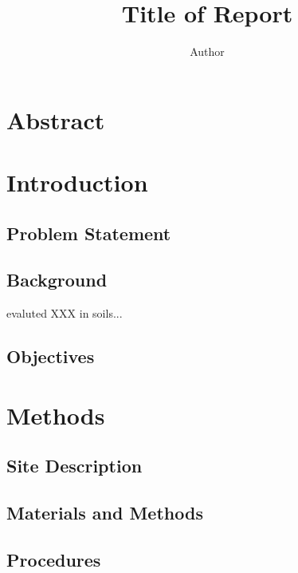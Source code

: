 \documentclass{article}\usepackage[]{graphicx}\usepackage[]{color}
\author{Author}
\title{Title of Report}
\begin{document}

\section{Abstract}



\section{Introduction}

\subsection{Problem Statement}

\subsection{Background}

\cite{lanphear1998contribution} evaluted XXX in soils...



\subsection{Objectives}



\section{Methods}

\subsection{Site Description}

\subsection{Materials and Methods}

\subsection{Procedures}
\end{document}
